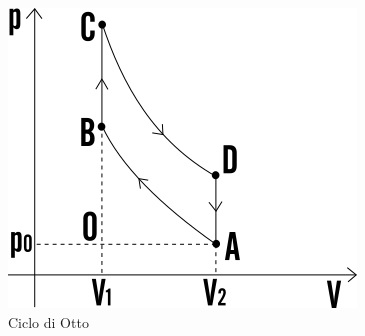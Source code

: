 \documentclass[class=book, crop=false, oneside, 12pt]{standalone}
\begin{document}
\begin{figure}[h]
    \includegraphics[scale=0.4]{ciclo-otto}
    \centering
    \caption{Ciclo di Otto}
\end{figure}
\end{document}

